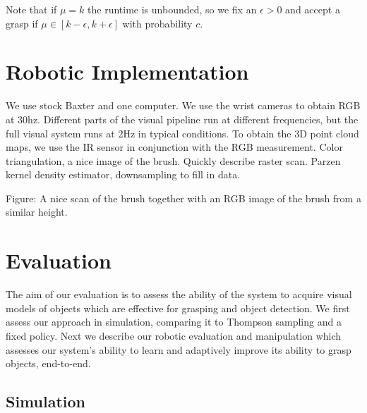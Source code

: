 \documentclass{article}
\begin{document}
Note that if $\mu = k$ the runtime is unbounded, so we fix an
$\epsilon > 0$ and accept a grasp if $\mu \in [k-\epsilon, k+\epsilon]$
with probability $c$.






\section{Robotic Implementation}

We use stock Baxter and one computer.  We use the wrist cameras to
obtain RGB at 30hz. Different parts of the visual pipeline run at
different frequencies, but the full visual system runs at 2Hz in
typical conditions.  To obtain the 3D point cloud maps, we use the IR
sensor in conjunction with the RGB measurement.  Color triangulation,
a nice image of the brush.  Quickly describe raster scan.  Parzen
kernel density estimator, downsampling to fill in data.

Figure: A nice scan of the brush together with an RGB image of the brush from a similar height.


 
\section{Evaluation}

The aim of our evaluation is to assess the ability of the system to
acquire visual models of objects which are effective for grasping and
object detection.  We first assess our approach in simulation,
comparing it to Thompson sampling and a fixed policy.  Next we
describe our robotic evaluation and manipulation which assesses our
system's ability to learn and adaptively improve its ability to grasp
objects, end-to-end.

\subsection{Simulation}
\end{document}

